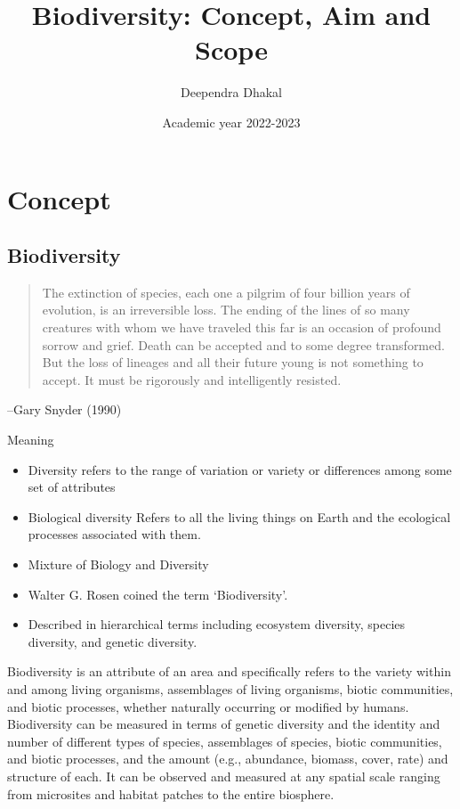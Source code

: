 \documentclass[
  ignorenonframetext,
  aspectratio=169]{beamer}
\title{Biodiversity: Concept, Aim and Scope}
\author{Deependra Dhakal}
\date{Academic year 2022-2023}
\institute{College of Natural Resource Management, Tikapur,
Kailali \and Agriculture and Forestry University}
\providecommand{\tightlist}{%
  \setlength{\itemsep}{0pt}\setlength{\parskip}{0pt}}
\begin{document}
\frame{\titlepage}

\begin{frame}[allowframebreaks]
  \tableofcontents[hideallsubsections]
\end{frame}
\hypertarget{concept}{%
\section{Concept}\label{concept}}

\hypertarget{biodiversity}{%
\subsection{Biodiversity}\label{biodiversity}}

\begin{frame}{}
\protect\hypertarget{section}{}
\begin{quote}
The extinction of species, each one a pilgrim of four billion years of evolution, is an irreversible loss. The ending of the lines of so many creatures with whom we have traveled this far is an occasion of profound sorrow and grief. Death can be accepted and to some degree transformed. But the loss of lineages and all their future young is not something to accept. It must be rigorously and intelligently resisted.
\end{quote}
\begin{flushright} --Gary Snyder (1990) \end{flushright}
\end{frame}

\begin{frame}{Meaning}
\protect\hypertarget{meaning}{}
\begin{itemize}
\tightlist
\item
  \alert{Diversity} refers to the range of variation or variety or
  differences among some set of attributes
\item
  \alert{Biological diversity} Refers to all the living things on Earth
  and the ecological processes associated with them.
\item
  Mixture of \alert{Biology} and \alert{Diversity}
\item
  Walter G. Rosen coined the term `Biodiversity'.
\item
  Described in hierarchical terms including ecosystem diversity, species
  diversity, and genetic diversity.
\end{itemize}
\end{frame}

\begin{frame}{}
\protect\hypertarget{section-1}{}
Biodiversity is an attribute of an area and specifically refers to the
variety within and among living organisms, assemblages of living
organisms, biotic communities, and biotic processes, whether naturally
occurring or modified by humans. Biodiversity can be measured in terms
of genetic diversity and the identity and number of different types of
species, assemblages of species, biotic communities, and biotic
processes, and the amount (e.g., abundance, biomass, cover, rate) and
structure of each. It can be observed and measured at any spatial scale
ranging from microsites and habitat patches to the entire biosphere.
\end{frame}
\end{document}
